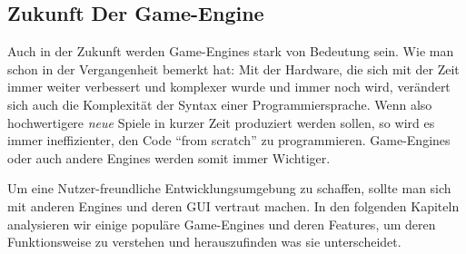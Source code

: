 \subsection{Zukunft Der Game-Engine}
Auch in der Zukunft werden Game-Engines stark von Bedeutung sein. Wie man schon in der Vergangenheit bemerkt hat: Mit der Hardware, die sich mit der Zeit immer weiter verbessert und komplexer wurde und immer noch wird, verändert sich auch die Komplexität der Syntax einer Programmiersprache.
Wenn also hochwertigere \textit{neue} Spiele in kurzer Zeit produziert werden sollen, so wird es immer ineffizienter, den Code "`from scratch"' zu programmieren. Game-Engines oder auch andere Engines  werden somit immer Wichtiger.

Um eine Nutzer-freundliche Entwicklungsumgebung zu schaffen, sollte man sich mit anderen Engines und deren GUI vertraut machen. In den folgenden Kapiteln analysieren wir einige populäre Game-Engines und deren Features, um deren Funktionsweise zu verstehen und herauszufinden was sie unterscheidet.